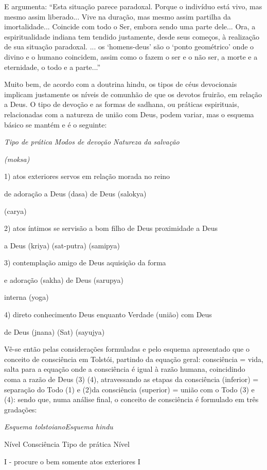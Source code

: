 E argumenta: ``Esta situação parece paradoxal. Porque o indivíduo está
vivo, mas mesmo assim liberado... Vive na duração, mas mesmo assim
partilha da imortalidade... Coincide com todo o Ser, embora sendo uma
parte dele... Ora, a espiritualidade indiana tem tendido justamente,
desde seus começos, à realização de sua situação paradoxal. ... os
`homens-deus' são o `ponto geométrico' onde o divino e o humano
coincidem, assim como o fazem o ser e o não ser, a morte e a eternidade,
o todo e a parte...''

Muito bem, de acordo com a doutrina hindu, os tipos de céus devocionais
implicam justamente os níveis de comunhão de que os devotos fruirão, em
relação a Deus. O tipo de devoção e as formas de sadhana, ou práticas
espirituais, relacionadas com a natureza de união com Deus, podem
variar, mas o esquema básico se mantém e é o seguinte:

\emph{Tipo de prática Modos de devoção Natureza da salvação}

\emph{(moksa)}

1) atos exteriores servos em relação morada no reino

de adoração a Deus (dasa) de Deus (salokya)

(carya)

2) atos íntimos se servisão a bom filho de Deus proximidade a Deus

a Deus (kriya) (sat-putra) (samipya)

3) contemplação amigo de Deus aquisição da forma

e adoração (sakha) de Deus (sarupya)

interna (yoga)

4) direto conhecimento Deus enquanto Verdade (união) com Deus

de Deus (jnana) (Sat) (sayujya)

Vê-se então pelas considerações formuladas e pelo esquema apresentado
que o conceito de consciência em Tolstói, partindo da equação geral:
consciência = vida, salta para a equação onde a consciência é igual à
razão humana, coincidindo coma a razão de Deus (3) (4), atravessando as
etapas da consciência (inferior) = separação do Todo (1) e (2)da
consciência (superior) = união com o Todo (3) e (4): sendo que, numa
análise final, o conceito de consciência é formulado em três gradações:

\emph{Esquema tolstoianoEsquema hindu}

Nível Consciência Tipo de prática Nível

I - procure o bem somente atos exteriores I

